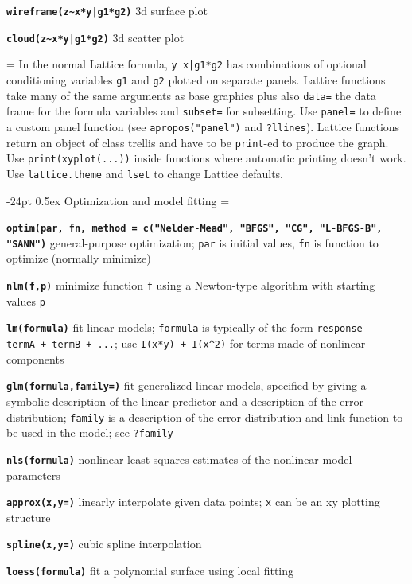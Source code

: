 \documentclass[10pt,landscape]{article}
\makeatletter
\renewcommand\section{\@startsection{section}{1}{0mm}%
                                     {-24pt}%
                                     {0.5ex}%
                                {\color{blue}\normalfont\large\bfseries}}
\newcommand{\code}{\texttt}
\newcommand{\bcode}[1]{\texttt{\textbf{#1}}}
\makeatother
\begin{document}
\begin{multicols*}{3}
\bcode{wireframe(z\~{}x*y|g1*g2)}  3d surface plot

\bcode{cloud(z\~{}x*y|g1*g2)}  3d scatter plot

\everypar={\hangindent=0mm}
In the normal Lattice formula, \code{y~x|g1*g2} has
combinations of optional conditioning variables \code{g1}
and \code{g2} plotted on separate panels. Lattice functions 
take many of the same arguments as base
graphics plus also \code{data=} the data frame for the formula
variables and \code{subset=} for subsetting. Use \code{panel=} to
define a custom panel function (see \code{apropos("panel")}
and \code{?llines}). Lattice functions return an object of class
trellis and have to be \code{print}-ed to produce the graph. Use
\code{print(xyplot(...))} inside functions where automatic
printing doesn't work. Use \code{lattice.theme} and \code{lset} to
change Lattice defaults.



\section{Optimization and model fitting}
\everypar={\hangindent=9mm}

\bcode{optim(par, fn, method = c("Nelder-Mead", "BFGS", "CG",
  "L-BFGS-B", "SANN")} general-purpose optimization; \code{par} is
  initial values, \code{fn} is function to optimize (normally minimize)

\bcode{nlm(f,p)} minimize function \code{f} using a Newton-type
algorithm with starting values \code{p}

\bcode{lm(formula)} fit linear models; \code{formula} is typically of
     the form \code{response ~ termA + termB + ...}; use \code{I(x*y)
     + I(x\^{}2)} for terms made of nonlinear components

\bcode{glm(formula,family=)} fit generalized linear models, specified by
     giving a symbolic description of the linear predictor and a
     description of the error distribution; \code{family} is a
     description of the error distribution and link function to
          be used in the model; see \code{?family}

\bcode{nls(formula)} nonlinear least-squares estimates of the nonlinear
     model parameters

\bcode{approx(x,y=)} linearly interpolate given data points; \code{x} can be an
xy plotting structure

\bcode{spline(x,y=)} cubic spline interpolation

\bcode{loess(formula)} fit a polynomial surface using local fitting


\end{multicols*}
\end{document}
